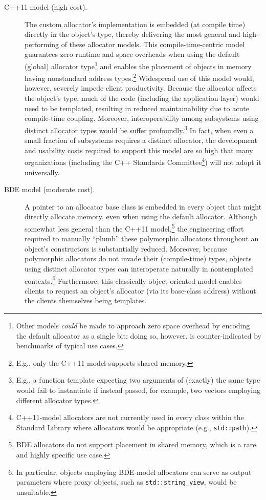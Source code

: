 \begin{description}
\item[C++11 model (high cost).] The custom allocator’s implementation is embedded
(at compile time) directly in the object’s type, thereby delivering the most general
and high-performing of these allocator models. This compile-time-centric model
guarantees zero runtime and space overheads when using the default (global)
allocator type\footnote{Other models \emph{could} be made to approach zero space overhead by encoding the default allocator as a
  single bit; doing so, however, is counter-indicated by benchmarks of typical use cases.}
and enables the placement of objects in memory having
nonstandard address types.\footnote{E.g., only the C++11 model supports shared memory.} Widespread use of this model would, however,
severely impede client productivity. Because the allocator affects the object’s
type, much of the code (including the application layer) would need to be
templated, resulting in reduced maintainability due to acute compile-time
coupling. Moreover, interoperability among subsystems using distinct allocator
types would be suffer profoundly.\footnote{E.g., a function template expecting two arguments of (exactly) the same type would fail to
instantiate if instead passed, for example, two vectors employing different allocator types.}
  In fact, when even a small fraction of
subsystems requires a distinct allocator, the development and usability costs
required to support this model are so high that many organizations (including the
C++ Standards Committee\footnote{C++11-model allocators are not currently used in every class within the Standard Library where
allocators would be appropriate (e.g., \lstinline{std::path}).}) will not adopt it universally.

\item[BDE model (moderate cost).] A pointer to an allocator base class is embedded in
every object that might directly allocate memory, even when using the default
allocator. Although somewhat less general than the C++11 model,\footnote{BDE allocators do not support placement in shared memory, which is a rare and highly specific use
case.} the
engineering effort required to manually “plumb” these polymorphic allocators
throughout an object’s constructors is substantially reduced. Moreover, because
polymorphic allocators do not invade their (compile-time) types, objects using
distinct allocator types can interoperate naturally in nontemplated contexts.\footnote{In
  particular, objects employing BDE-model allocators can serve as output parameters where proxy
objects, such as \lstinline{std::string_view}, would be unsuitable.}
Furthermore, this classically object-oriented model enables clients to request an
object’s allocator (via its base-class address) without the clients themselves being
templates.


\end{description}
